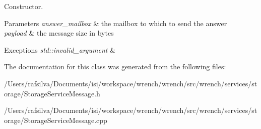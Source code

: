Constructor. 


\begin{DoxyParams}{Parameters}
{\em answer\+\_\+mailbox} & the mailbox to which to send the answer \\
\hline
{\em payload} & the message size in bytes\\
\hline
\end{DoxyParams}

\begin{DoxyExceptions}{Exceptions}
{\em std\+::invalid\+\_\+argument} & \\
\hline
\end{DoxyExceptions}


The documentation for this class was generated from the following files\+:\begin{DoxyCompactItemize}
\item 
/\+Users/rafsilva/\+Documents/isi/workspace/wrench/wrench/src/wrench/services/storage/Storage\+Service\+Message.\+h\item 
/\+Users/rafsilva/\+Documents/isi/workspace/wrench/wrench/src/wrench/services/storage/Storage\+Service\+Message.\+cpp\end{DoxyCompactItemize}
